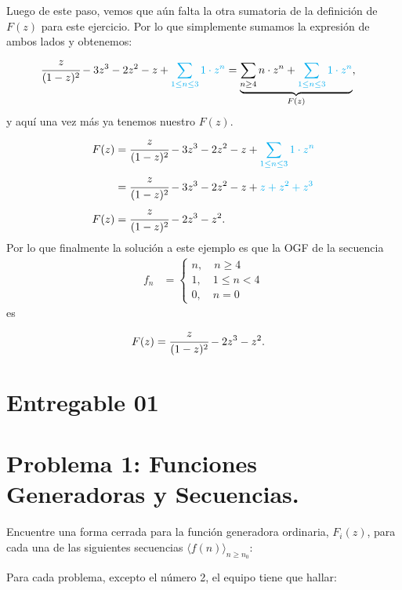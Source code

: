 Luego de este paso, vemos que aún falta la otra sumatoria de la definición de $F(z)$ para este ejercicio. Por lo que simplemente sumamos la expresión de ambos lados y obtenemos:
\begin{align*}
    \cfrac{z}{(1-z)^2}-3z^3-2z^2-z+{\color{cyan}\sum_{1\leq n\leq 3}{1\cdot z^n}}&=\underset{F(z)}{\underbrace{\sum_{n\geq4}{n\cdot z^n}+{\color{cyan}\sum_{1\leq n\leq 3}{1\cdot z^n}}}},
\end{align*}
y aquí una vez más ya tenemos nuestro $F(z)$.
\begin{align*}
    F(z)&=\cfrac{z}{(1-z)^2}-3z^3-2z^2-z+{\color{cyan}\sum_{1\leq n\leq 3}{1\cdot z^n}}\\
    &=\cfrac{z}{(1-z)^2}-3z^3-2z^2-z+{\color{cyan}z+z^2+z^3}\\
    F(z)&=\cfrac{z}{(1-z)^2}-2z^3-z^2.
\end{align*}
Por lo que finalmente la solución a este ejemplo es que la OGF de la secuencia 
\begin{align*}
    f_n&=\begin{cases}
    n,\quad n\geq4\\
    1,\quad 1\leq n < 4\\
    0,\quad n=0
    \end{cases}
\end{align*}
es
\begin{align*}
F(z)&=\cfrac{z}{(1-z)^2}-2z^3-z^2.
\end{align*}
\clearpage
\section{Entregable 01}
\section*{Problema 1: Funciones Generadoras y Secuencias.}

Encuentre una forma cerrada para la función generadora ordinaria, $F_i(z)$, para cada una de las siguientes secuencias $\langle f(n) \rangle_{n\ge n_0}$:
\label{sec:ogf-seq}
\begin{flushleft}
\end{flushleft}
Para cada problema, excepto el número 2, el equipo tiene que hallar:

